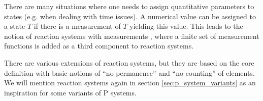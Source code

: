 There are many situations where one needs to assign quantitative parameters to states (e.g. when dealing with time issues). A numerical value can be assigned to a state $T$ if there is a measurement of $T$ yielding this value. This leads to the notion of reaction systems with measurements \cite{Ehrenfeucht09Reaction}, where a finite set of measurement functions is added as a third component to reaction systems.

There are various extensions of reaction systems, but they are based on the core definition with basic notions of ``no permanence'' and ``no counting'' of elements. We will mention reaction systems again in section \ref{sec:p_system_variants} as an inspiration for some variants of P systems.

